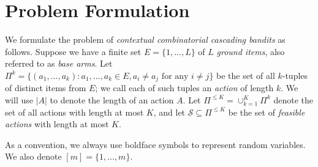 \documentclass{article}
\newcommand{\EE}{\mathbb{E}}
\newcommand{\RR}{\mathbb{R}}
\newcommand{\bA}{\mathbf{A}}
\newcommand{\br}{\mathbf{r}}
\newcommand{\bw}{\mathbf{w}}
\newcommand{\cS}{\mathcal{S}}
\newcommand{\argmax}{\mathrm{argmax}}
\newcommand{\abs}[1]{\left| #1 \right|}
\begin{document}

\section{Problem Formulation}

We formulate the problem of {\em contextual combinatorial cascading bandits} as follows. Suppose we have a finite set $E=\{1,...,L\}$ of $L$ \textit{ground items}, also referred to as {\em base arms}. Let $\Pi^k=\{(a_1,...,a_k): a_1,...,a_k \in E, a_i \neq a_j \text{ for any } i \neq j\}$ be the set of all $k$-tuples of distinct items from $E$; we call each of such tuples an {\em action} of length $k$. We will use $|A|$ to denote the length of an action $A$. Let $\Pi^{\leq K}= \cup_{k=1}^K \Pi^{k}$ denote the set of all actions with length at most $K$, and let $\cS \subseteq \Pi^{\leq K}$ be the set of \textit{feasible actions} with length at most $K$.

As a convention, we always use boldface symbols to represent random variables. We also denote $[m] = \{1,\ldots,m\}$.
\end{document}
